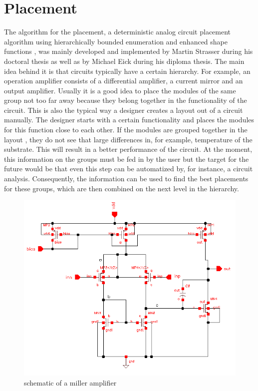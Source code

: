\chapter{Placement}
The algorithm for the placement, a deterministic analog circuit placement algorithm using hierarchically bounded enumeration and enhanced shape functions \cite{iccad:plantage}, was mainly developed and implemented by Martin Strasser during his doctoral thesis as well as by Michael Eick during his diploma thesis. The main idea behind it is that circuits typically have a certain hierarchy. For example, an operation amplifier  consists of a differential amplifier, a current mirror and an output amplifier. Usually it is a good idea to place the modules of the same group not too far away because they belong together in the functionality of the circuit. This is also the typical way a designer creates a layout out of a circuit manually. The designer starts with a certain functionality and places the modules for this function close to each other. If the modules are grouped together in the layout , they do not see that large differences in, for example, temperature of the substrate. This will result in a better performance of the circuit.
At the moment, this information on the groups must be fed in by the user but the target for the future would be that even this step can be automatized by, for instance, a circuit analysis. Consequently, the information can be used to find the best placements for these groups, which are then combined on the next level in the hierarchy.

\begin{figure}
	\centering
	\includegraphics[scale=0.6]{FIG/miller_amplifier_schematic.png}
	\caption{schematic of a miller amplifier}
	\label{fig:miller_amplifier_schematic}
\end{figure}

